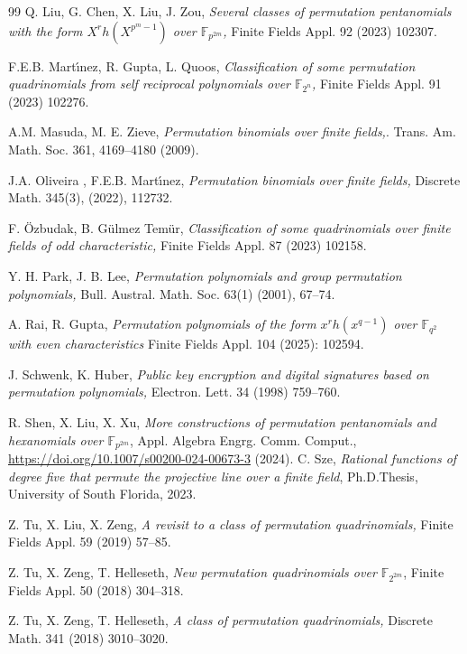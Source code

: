 \documentclass[12pt]{amsart}
\numberwithin{equation}{section}
\theoremstyle{definition}
\newcommand{\F}{\mathbb F}
\begin{document}
\begin{thebibliography}{99}
 Q. Liu, G. Chen, X. Liu, J. Zou, {\it Several classes of permutation pentanomials with the form $X^rh(X^{p^m- 1})$ over $\F_{p^{2m}}$,} Finite Fields Appl. 92 (2023) 102307.

 F.E.B. Mart{\'\i}nez, R. Gupta, L. Quoos, {\it Classification of some permutation quadrinomials from self reciprocal polynomials over $\F_{2^n}$,} Finite Fields Appl. 91 (2023) 102276.

 A.M. Masuda, M. E. Zieve, {\it Permutation binomials over finite fields,}. Trans. Am. Math. Soc. 361, 4169--4180 (2009).

 J.A. Oliveira , F.E.B. Mart{\'\i}nez, {\it Permutation binomials over finite fields,} Discrete Math. 345(3), (2022), 112732.


 F. {\"O}zbudak, B. G{\"u}lmez Tem{\"u}r, {\it Classification of some quadrinomials over finite fields of odd characteristic,} Finite Fields Appl. 87 (2023) 102158.

 Y. H. Park, J. B. Lee, {\it Permutation polynomials and group permutation polynomials,} Bull. Austral. Math. Soc. 63(1) (2001), 67--74.

 A. Rai, R. Gupta, {\it Permutation polynomials of the form $x^rh(x^{q- 1})$ over $\F_{q^2}$ with even characteristics} Finite Fields Appl. 104 (2025): 102594.

 J. Schwenk, K. Huber, {\it Public key encryption and digital signatures based on permutation polynomials,} Electron. Lett. 34 (1998) 759--760.

 R. Shen, X. Liu, X. Xu, {\it More constructions of permutation pentanomials and hexanomials over $\F_{p^{2m}}$}, Appl. Algebra Engrg. Comm. Comput., \url{https://doi.org/10.1007/s00200-024-00673-3} (2024).
 {C. Sze, {\it Rational functions of degree five that permute the projective line over a finite field}, Ph.D.Thesis, University of South Florida, 2023.}

 Z. Tu, X. Liu, X. Zeng, {\it A revisit to a class of permutation quadrinomials,} Finite Fields Appl. 59 (2019) 57--85.

 Z. Tu, X. Zeng, T. Helleseth, {\it New permutation quadrinomials over $\F_{2^{2m}}$}, Finite Fields Appl. 50 (2018) 304--318.

  Z. Tu, X. Zeng, T. Helleseth, {\it A class of permutation quadrinomials,} Discrete Math. 341 (2018) 3010--3020.



\end{thebibliography}
\end{document}
